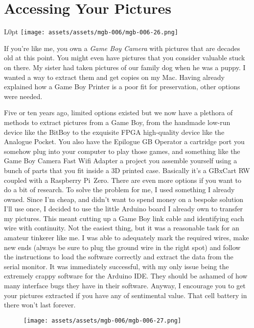 \documentclass{book}
\begin{document}
\FloatBarrier\needspace{10mm}\section*{Accessing Your Pictures}\nopagebreak[4]

\begin{wrapfigure}{L}{0pt} \texttt{[image: assets/assets/mgb-006/mgb-006-26.png]}\end{wrapfigure}
If you’re like me, you own a \emph{Game Boy Camera} with pictures that are decades old at this point. You might even have pictures that you consider valuable stuck on there. My sister had taken pictures of our family dog when he was a puppy. I wanted a way to extract them and get copies on my Mac. Having already explained how a Game Boy Printer is a poor fit for preservation, other options were needed.

Five or ten years ago, limited options existed but we now have a plethora of methods to extract pictures from a Game Boy, from the handmade low-run device like the BitBoy to the exquisite FPGA high-quality device like the Analogue Pocket. You also have the Epilogue GB Operator a cartridge port you somehow plug into your computer to play those games, and something like the Game Boy Camera Fast Wifi Adapter a project you assemble yourself using a bunch of parts that you fit inside a 3D printed case. Basically it’s a GBxCart RW coupled with a Raspberry Pi~Zero. There are even more options if you want to do a bit of research. To solve the problem for me, I used something I already owned. Since I’m cheap, and didn’t want to spend money on a bespoke solution I’ll use once, I decided to use the little Arduino board I already own to transfer my pictures. This meant cutting up a Game Boy link cable and identifying each wire with continuity. Not the easiest thing, but it was a reasonable task for an amateur tinkerer like me. I was able to adequately mark the required wires, make new ends (always be sure to plug the ground wire in the right spot) and follow the instructions to load the software correctly and extract the data from the serial monitor. It was immediately successful, with my only issue being the extremely crappy software for the Arduino IDE. They should be ashamed of how many interface bugs they have in their software. Anyway, I encourage you to get your pictures extracted if you have any of sentimental value. That cell battery in there won’t last forever.

\begin{figure}[hbt]
\vskip 10pt
\centering \texttt{[image: assets/assets/mgb-006/mgb-006-27.png]}
\vskip 6pt
\end{figure}
\end{document}
